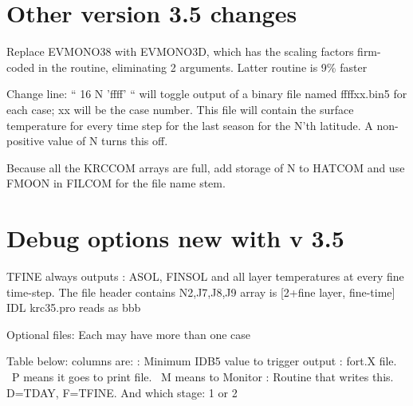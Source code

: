 \documentclass{article}
\begin{document}
\section{Other version 3.5 changes}
Replace EVMONO38 with EVMONO3D, which has the scaling factors firm-coded in the
routine, eliminating 2 arguments. Latter routine is 9\% faster

Change line: ``  16 N 'ffff' `` will toggle output of a binary file named ffffxx.bin5 for
each case; xx will be the case number. This file will contain the surface
temperature for every time step for the last season for the N'th latitude. A
non-positive value of N turns this off.

Because all the KRCCOM arrays are full, add storage of N to HATCOM and use FMOON in FILCOM for the file name stem.

\appendix %


\section{Debug options new with v 3.5}

TFINE always outputs : ASOL, FINSOL
and all layer temperatures at every fine time-step. 
\qi The file header contains N2,J7,J8,J9 
\qi array is [2+fine layer, fine-time]  \hfill IDL krc35.pro reads as bbb

Optional files:  Each may have more than one case

Table below: columns are:
: Minimum IDB5 value to trigger output
: fort.X file. \  P means it goes to print file. \ M means to Monitor
: Routine that writes this. D=TDAY, F=TFINE. And which stage: 1 or 2
\end{document}
